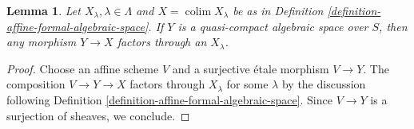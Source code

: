 \documentclass{stacks-project}
\theoremstyle{plain}
\newtheorem{lemma}[subsection]{Lemma}
\theoremstyle{definition}
\theoremstyle{remark}
\numberwithin{equation}{subsection}
\def\colim{\mathop{\mathrm{colim}}\nolimits}
\begin{document}
\begin{lemma}
\label{lemma-factor-through-thickening}
Let $X_\lambda, \lambda \in \Lambda$ and $X = \colim X_\lambda$
be as in Definition \ref{definition-affine-formal-algebraic-space}.
If $Y$ is a quasi-compact algebraic space over $S$, then any
morphism $Y \to X$ factors through an $X_\lambda$.
\end{lemma}

\begin{proof}
Choose an affine scheme $V$ and a surjective \'etale morphism
$V \to Y$. The composition $V \to Y \to X$ factors through
$X_\lambda$ for some $\lambda$ by the discussion following
Definition \ref{definition-affine-formal-algebraic-space}.
Since $V \to Y$ is a surjection of sheaves, we conclude.
\end{proof}
\end{document}
